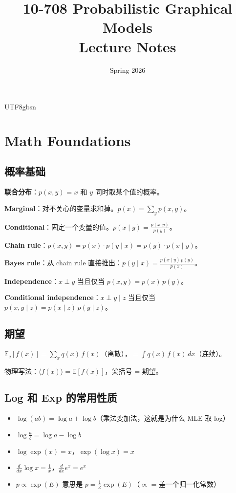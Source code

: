 \documentclass[11pt]{article}
\title{10-708 Probabilistic Graphical Models \\ Lecture Notes}
\author{}
\date{Spring 2026}
\begin{document}
\begin{CJK}{UTF8}{gbsn}
\maketitle
\tableofcontents
\newpage

\section*{Math Foundations}

\subsection*{概率基础}

\textbf{联合分布}：$p(x, y)$ = $x$ 和 $y$ 同时取某个值的概率。

\textbf{Marginal}：对不关心的变量求和掉。$p(x) = \sum_y p(x, y)$。

\textbf{Conditional}：固定一个变量的值。$p(x \mid y) = \frac{p(x, y)}{p(y)}$。

\textbf{Chain rule}：$p(x, y) = p(x) \cdot p(y \mid x) = p(y) \cdot p(x \mid y)$。

\textbf{Bayes rule}：从 chain rule 直接推出：$p(y \mid x) = \frac{p(x \mid y)\, p(y)}{p(x)}$。

\textbf{Independence}：$x \perp y$ 当且仅当 $p(x, y) = p(x)\, p(y)$。

\textbf{Conditional independence}：$x \perp y \mid z$ 当且仅当 $p(x, y \mid z) = p(x \mid z)\, p(y \mid z)$。

\subsection*{期望}

$\mathbb{E}_q[f(x)] = \sum_x q(x)\, f(x)$（离散），$= \int q(x)\, f(x)\, dx$（连续）。

物理写法：$\langle f(x) \rangle = \mathbb{E}[f(x)]$，尖括号 = 期望。

\subsection*{Log 和 Exp 的常用性质}

\begin{itemize}[nosep]
  \item $\log(ab) = \log a + \log b$（乘法变加法，这就是为什么 MLE 取 log）
  \item $\log \frac{a}{b} = \log a - \log b$
  \item $\log \exp(x) = x$，$\exp(\log x) = x$
  \item $\frac{d}{dx} \log x = \frac{1}{x}$，$\frac{d}{dx} e^x = e^x$
  \item $p \propto \exp(E)$ 意思是 $p = \frac{1}{Z}\exp(E)$（$\propto$ = 差一个归一化常数）
\end{itemize}


\end{CJK}
\end{document}
